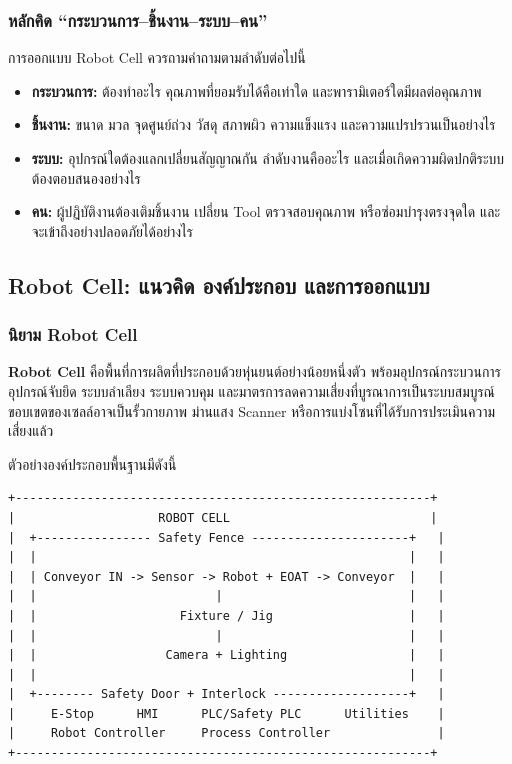 \subsubsection{หลักคิด “กระบวนการ–ชิ้นงาน–ระบบ–คน”}

การออกแบบ Robot Cell ควรถามคำถามตามลำดับต่อไปนี้

\begin{itemize}
    \item \textbf{กระบวนการ:} ต้องทำอะไร คุณภาพที่ยอมรับได้คือเท่าใด และพารามิเตอร์ใดมีผลต่อคุณภาพ
    \item \textbf{ชิ้นงาน:} ขนาด มวล จุดศูนย์ถ่วง วัสดุ สภาพผิว ความแข็งแรง และความแปรปรวนเป็นอย่างไร
    \item \textbf{ระบบ:} อุปกรณ์ใดต้องแลกเปลี่ยนสัญญาณกัน ลำดับงานคืออะไร และเมื่อเกิดความผิดปกติระบบต้องตอบสนองอย่างไร
    \item \textbf{คน:} ผู้ปฏิบัติงานต้องเติมชิ้นงาน เปลี่ยน Tool ตรวจสอบคุณภาพ หรือซ่อมบำรุงตรงจุดใด และจะเข้าถึงอย่างปลอดภัยได้อย่างไร
\end{itemize}



\subsection{Robot Cell: แนวคิด องค์ประกอบ และการออกแบบ}

\subsubsection{นิยาม Robot Cell}

\textbf{Robot Cell} คือพื้นที่การผลิตที่ประกอบด้วยหุ่นยนต์อย่างน้อยหนึ่งตัว พร้อมอุปกรณ์กระบวนการ อุปกรณ์จับยึด ระบบลำเลียง ระบบควบคุม และมาตรการลดความเสี่ยงที่บูรณาการเป็นระบบสมบูรณ์ ขอบเขตของเซลล์อาจเป็นรั้วกายภาพ ม่านแสง Scanner หรือการแบ่งโซนที่ได้รับการประเมินความเสี่ยงแล้ว

ตัวอย่างองค์ประกอบพื้นฐานมีดังนี้

\begin{verbatim}
+----------------------------------------------------------+
|                    ROBOT CELL                            |
|  +---------------- Safety Fence ----------------------+   |
|  |                                                    |   |
|  | Conveyor IN -> Sensor -> Robot + EOAT -> Conveyor  |   |
|  |                         |                          |   |
|  |                    Fixture / Jig                   |   |
|  |                         |                          |   |
|  |                  Camera + Lighting                 |   |
|  |                                                    |   |
|  +-------- Safety Door + Interlock -------------------+   |
|     E-Stop      HMI      PLC/Safety PLC      Utilities    |
|     Robot Controller     Process Controller               |
+----------------------------------------------------------+
\end{verbatim}

